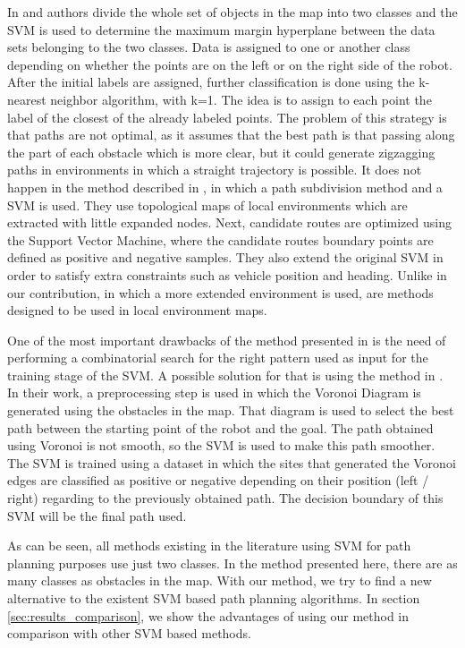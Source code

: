 In \cite{sarkar2008mobile} and \cite{tennety2009support} authors divide the whole set of objects in the map into two classes and the \ac{SVM} is used to determine the maximum margin hyperplane between the data sets belonging to the two classes. Data is assigned to one or another class depending on whether the points are on the left or on the right side of the robot. After the initial labels are assigned, further classification is done using the k-nearest neighbor algorithm, with k=1. The idea is to assign to each point the label of the closest of the already labeled points. The problem of this strategy is that paths are not optimal, as it assumes that the best path is that passing along the part of each obstacle which is more clear, but it could generate zigzagging paths in environments in which a straight trajectory is possible. It does not happen in the method described in \cite{qingyang2012local}, in which a path subdivision method and a \ac{SVM} is used. They use topological maps of local environments which are extracted with little expanded nodes. Next, candidate routes are optimized using the Support Vector Machine, where the candidate routes boundary points are defined as positive and negative samples. They also extend the original \ac{SVM} \cite{cortes1995support} in order to satisfy extra constraints such as vehicle position and heading. Unlike in our contribution, in which a more extended environment is used, \cite{sarkar2008mobile, tennety2009support, qingyang2012local} are methods designed to be used in local environment maps.

One of the most important drawbacks of the method presented in \cite{miura2006support} is the need of performing a combinatorial search for the right pattern used as input for the training stage of the \ac{SVM}. A possible solution for that is using the method in \cite{yang2012safe}. In their work, a preprocessing step is used in which the Voronoi Diagram is generated using the obstacles in the map. That diagram is used to select the best path between the starting point of the robot and the goal. The path obtained using Voronoi is not smooth, so the \ac{SVM} is used to make this path smoother. The \ac{SVM} is trained using a dataset in which the sites that generated the Voronoi edges are classified as positive or negative depending on their position (left / right) regarding to the previously obtained path. The decision boundary of this \ac{SVM} will be the final path used.

As can be seen, all methods existing in the literature using \ac{SVM} for path planning purposes use just two classes. In the method presented here, there are as many classes as obstacles in the map. With our method, we try to find a new alternative to the existent \ac{SVM} based path planning algorithms. In section \ref{sec:results_comparison}, we show the advantages of using our method in comparison with other \ac{SVM} based methods.

